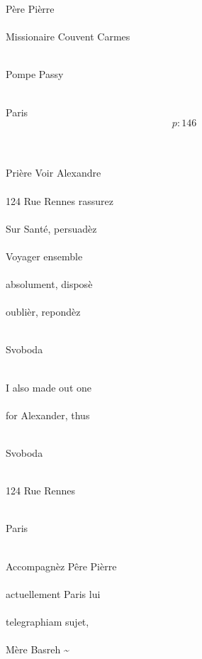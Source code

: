 \documentclass{report}
\begin{document}
	\par{
 	Père Pièrre\ \\\ \\Missionaire Couvent Carmes\ \\\ \\
	}

	\par{
 	Pompe Passy\ \\\ \\
	}

	\par{
 	Paris\ \\
  \[p: 146 \]
\ \\\ \\
	}

	\par{
 	Prière Voir Alexandre\ \\\ \\124 Rue Rennes rassurez\ \\\ \\Sur Santé, persuadèz\ \\\ \\Voyager ensemble\ \\\ \\absolument, disposè\ \\\ \\oublièr, repondèz\ \\\ \\
	}

	\par{
 	Svoboda\ \\\ \\
	}

	\par{
 	I also made out one\ \\\ \\for Alexander, thus\ \\\ \\
	}

	\par{
 	Svoboda\ \\\ \\
	}

	\par{
 	124 Rue Rennes\ \\\ \\
	}

	\par{
 	Paris\ \\\ \\
	}

	\par{
 	Accompagnèz Pêre Pièrre\ \\\ \\actuellement Paris lui\ \\\ \\telegraphiam sujet,\ \\\ \\Mère Basreh \~{}\ \\\ \\
	}
\end{document}

